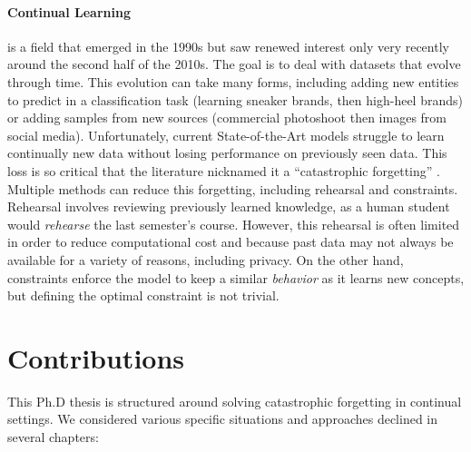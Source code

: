 \paragraph{Continual Learning} is a field that emerged in the 1990s but saw renewed interest only
very recently around the second half of the 2010s. The goal is to deal with datasets that evolve
through time. This evolution can take many forms, including adding new entities to predict in a
classification task (\eg learning sneaker brands, then high-heel brands) or adding samples from new
sources (\eg commercial photoshoot then images from social media). Unfortunately, current
State-of-the-Art models struggle to learn continually new data without losing performance on
previously seen data. This loss is so critical that the literature nicknamed it a ``catastrophic
forgetting'' \citep{robins1995catastrophicforgetting,french1999catastrophicforgetting}. Multiple
methods can reduce this forgetting, including rehearsal and constraints. Rehearsal involves
reviewing previously learned knowledge, as a human student would \textit{rehearse} the last
semester's course. However, this rehearsal is often limited in order to reduce computational cost
and because past data may not always be available for a variety of reasons, including privacy. On
the other hand, constraints enforce the model to keep a similar \textit{behavior} as it learns new
concepts, but defining the optimal constraint is not trivial.

\section{Contributions}

This Ph.D thesis is structured around solving catastrophic forgetting in continual settings. We
considered various specific situations and approaches declined in several chapters:

